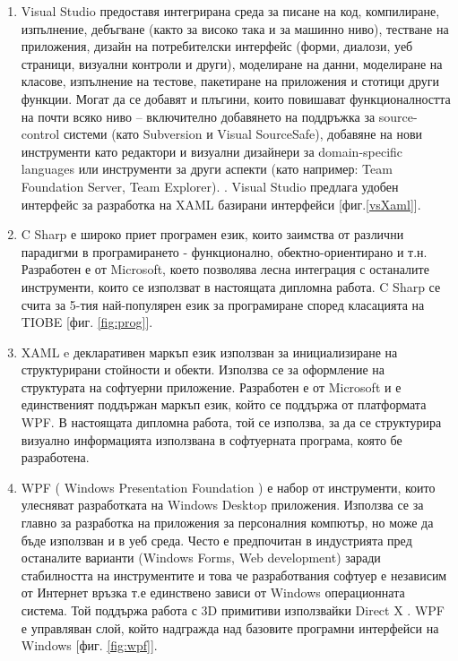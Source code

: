 \begin{enumerate}
    \item Visual Studio предоставя интегрирана среда за писане на код, компилиране, изпълнение, дебъгване (както за високо така и за машинно ниво), тестване на приложения, дизайн на потребителски интерфейс (форми, диалози, уеб страници, визуални контроли и други), моделиране на данни, моделиране на класове, изпълнение на тестове, пакетиране на приложения и стотици други функции. Могат да се добавят и плъгини, които повишават функционалността на почти всяко ниво – включително добавянето на поддръжка за source-control системи (като Subversion и Visual SourceSafe), добавяне на нови инструменти като редактори и визуални дизайнери за domain-specific languages или инструменти за други аспекти (като например: Team Foundation Server, Team Explorer). \cite{vs}. Visual Studio предлага удобен интерфейс за разработка на XAML базирани интерфейси [фиг.\ref{vsXaml}].
    
    \item C Sharp е широко приет програмен език, които заимства от различни парадигми в програмирането - функционално, обектно-ориентирано и т.н. Разработен е от Microsoft, което позволява лесна интеграция с останалите инструменти, които се използват в настоящата дипломна работа. C Sharp се счита за 5-тия най-популярен език за програмиране според класацията на TIOBE [фиг. \ref{fig:prog}].
    
    \item XAML e декларативен маркъп език използван за инициализиране на структурирани стойности и обекти. Използва се за оформление на структурата на софтуерни приложение. Разработен е от Microsoft и е единственият поддържан маркъп език, който се поддържа от платформата WPF. В настоящата дипломна работа, той се използва, за да се структурира визуално информацията използвана в софтуерната програма, която бе разработена.
    
    \item WPF ( Windows Presentation Foundation ) \cite{wpf} е набор от инструменти, които улесняват разработката на Windows Desktop приложения. Използва се за главно за разработка на приложения за персоналния компютър, но може да бъде използван и в уеб среда. Често е предпочитан в индустрията пред останалите варианти (Windows Forms, Web development) заради стабилността на инструментите и това че разработвания софтуер е независим от Интернет връзка т.е единствено зависи от Windows операционната система. Той поддържа работа с 3D примитиви използвайки Direct X \cite{wpfUsage}. WPF е управляван слой, който надгражда над базовите програмни интерфейси на Windows [фиг. \ref{fig:wpf}].
    

\end{enumerate}
